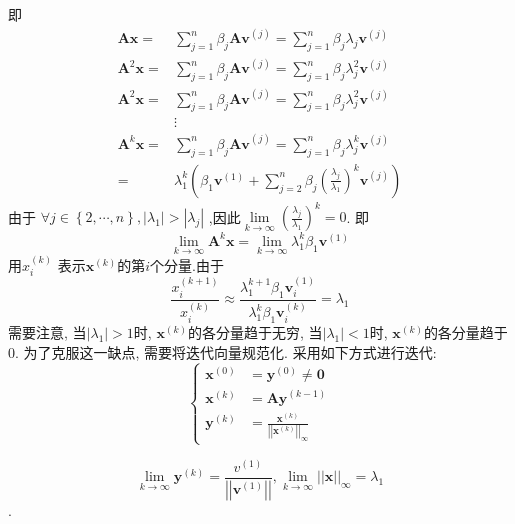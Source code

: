 即
$$
\begin{aligned}
\mathbf{Ax} = &\sum_{j=1}^{n} \beta_j \mathbf{Av}^{\left(j\right)} = \sum_{j=1}^{n} \beta_j \lambda_j \mathbf{v}^{\left(j\right)} \\
\mathbf{A}^2\mathbf{x} = &\sum_{j=1}^{n} \beta_j \mathbf{Av}^{\left(j\right)} = \sum_{j=1}^{n} \beta_j \lambda_j^2 \mathbf{v}^{\left(j\right)} \\
\mathbf{A}^2\mathbf{x} = &\sum_{j=1}^{n} \beta_j \mathbf{Av}^{\left(j\right)} = \sum_{j=1}^{n} \beta_j \lambda_j^2 \mathbf{v}^{\left(j\right)} \\
&\vdots \\
\mathbf{A}^k\mathbf{x} =& \sum_{j=1}^{n} \beta_j \mathbf{Av}^{\left(j\right)} = \sum_{j=1}^{n} \beta_j \lambda_j^k \mathbf{v}^{\left(j\right)} \\
= &\lambda_1^k\left(\beta_1 \mathbf{v}^{\left(1\right)} + \sum_{j=2}^{n}\beta_j\left(\frac{\lambda_j}{\lambda_1}\right)^k\mathbf{v}^{\left(j\right)}\right)
\end{aligned}$$
由于
$\forall j \in \left\{2,\cdots,n\right\}, \left|\lambda_1\right| > \left|\lambda_j\right|$
,因此$\lim\limits_{k \to \infty}  \left(\frac{\lambda_j}{\lambda_1}\right)^k= 0$. 即
$$\lim\limits_{k \to \infty} \mathbf{A}^k \mathbf{x} = \lim\limits_{k \to \infty}\lambda_1^k \beta_1 \mathbf{v}^{\left(1\right)}$$
用$x_i^{\left(k\right)}$ 表示$\mathbf{x}^{\left(k\right)}$的第$i$个分量.由于
$$\frac{x_i^{\left(k+1\right)}}{x_i^{\left(k\right)}} \approx \frac{\lambda_1^{k+1} \beta_1 \mathbf{v}_i^{\left(1\right)}}{\lambda_1^k \beta_1 \mathbf{v}_i^{\left(k\right)}} = \lambda_1$$
需要注意, 当$\left|\lambda_1 \right| > 1$时, $\mathbf{x}^{\left(k\right)}$的各分量趋于无穷, 当$\left|\lambda_1\right| < 1$时, $\mathbf{x}^{\left(k\right)}$的各分量趋于0. 为了克服这一缺点, 需要将迭代向量规范化. 采用如下方式进行迭代:
$$
\left\{
\begin{aligned}
\mathbf{x}^{\left(0\right)} &= \mathbf{y}^{\left(0\right)} \neq \mathbf{0} \\
\mathbf{x}^{\left(k\right)} &= \mathbf{Ay}^{\left(k-1\right)} \\
\mathbf{y}^{\left(k\right)} & = \frac{\mathbf{x}^{\left(k\right)}}{\left|  \left|\mathbf{x}^{\left(k\right)} \right|\right|_{\infty}}
\end{aligned}
\right.$$

$$\lim\limits_{k \to \infty} \mathbf{y}^{\left(k\right)} = \frac{v^{\left(1\right)}}{\left|\left|\mathbf{v}^{\left(1\right)} \right| \right|}, \lim\limits_{k \to \infty} \left|\left|\mathbf{x} \right| \right|_{\infty } = \lambda_1$$.

